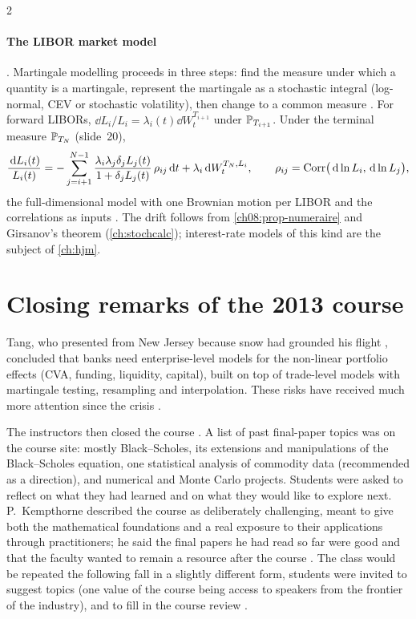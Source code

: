 \begin{paracol}{2}
\paragraph{The LIBOR market model} . Martingale modelling proceeds in three steps: find the
measure under which a quantity is a martingale, represent the martingale as a stochastic integral (log-normal, CEV or
stochastic volatility), then change to a common measure . For forward LIBORs,
$\dd L_i/L_i=\lambda_i(t)\dd W_t^{T_{i+1}}$ under $\mathbb{P}_{T_{i+1}}$. Under the terminal measure $\mathbb{P}_{T_N}$ (slide~20),
\[
  \frac{\,\mathrm{d} L_i(t)}{L_i(t)}=-\sum_{j=i+1}^{N-1}\frac{\lambda_i\lambda_j\delta_jL_j(t)}{1+\delta_jL_j(t)}\,\rho_{ij}\,\mathrm{d} t
  +\lambda_i\,\mathrm{d} W_t^{T_N,L_i},\qquad \rho_{ij}=\operatorname{Corr}\bigl(\,\mathrm{d}\ln L_i,\,\mathrm{d}\ln L_j\bigr),
\]
the full-dimensional model with one Brownian motion per LIBOR and the correlations as inputs .
The drift follows from \cref{ch08:prop-numeraire} and Girsanov's theorem (\cref{ch:stochcalc}); interest-rate models
of this kind are the subject of \cref{ch:hjm}.

\section{Closing remarks of the 2013 course}\label{ch08:sec-closing}

\begin{coursenote}
Tang, who presented from New Jersey because snow had grounded his flight , concluded that banks need
enterprise-level models for the non-linear portfolio effects (CVA, funding, liquidity, capital), built on top of
trade-level models with martingale testing, resampling and interpolation. These risks have received much more
attention since the crisis .

The instructors then closed the course . A list of past final-paper topics was on the course site:
mostly Black--Scholes, its extensions and manipulations of the Black--Scholes equation, one statistical analysis of
commodity data (recommended as a direction), and numerical and Monte Carlo projects. Students were asked to reflect
on what they had learned and on what they would like to explore next. P.~Kempthorne described the course as
deliberately challenging, meant to give both the mathematical foundations and a real exposure to their applications
through practitioners; he said the final papers he had read so far were good and that the faculty wanted to remain
a resource after the course . The class would be repeated the following fall in a slightly
different form, students were invited to suggest topics (one value of the course being access to speakers from the
frontier of the industry), and to fill in the course review .
\end{coursenote}


\end{paracol}
